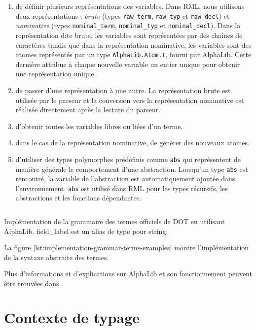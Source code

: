 \begin{enumerate}
  \item de définir plusieurs représentations des variables. Dans RML, nous utilisons deux
  représentations : \textit{brute} (types \verb|raw_term|,
  \verb|raw_typ| et \verb|raw_decl|) et \textit{nominative}
  (types \verb|nominal_term|, \verb|nominal_typ| et \verb|nominal_decl|). Dans la
  représentation dite brute, les variables sont représentées par des chaînes de
  caractères tandis que dans la représentation nominative, les variables sont
  des atomes représentés par un type \verb|AlphaLib.Atom.t|, fourni par
  AlphaLib. Cette dernière attribue à chaque nouvelle variable un entier
  unique pour obtenir une représentation unique.
\item de passer d'une représentation à une autre. La représentation brute est
  utilisée par le parseur et la conversion vers la représentation nominative est
  réalisée directement après la lecture du parseur.
\item d'obtenir toutes les variables libres ou liées d'un terme.
\item dans le cas de la représentation nominative, de générer des nouveaux atomes.
\item d'utiliser des types polymorphes prédéfinis comme \verb|abs| qui représentent de manière générale
  le comportement d'une abstraction. Lorsqu'un type \verb|abs|
  est rencontré, la variable de l'abstraction est automatiquement ajoutée dans
  l'environnement. \verb|abs| est utilisé dans RML pour les types récursifs,
  les abstractions et les fonctions dépendantes.
\end{enumerate}

\begin{listing}
  \inputminted{OCaml}{codes/grammar.ml}
  \caption{Implémentation de la grammaire des termes officiels de DOT en
    utilisant AlphaLib. field\_label est un alias de type pour string.}
  \label{lst:implementation-grammar-terms-examples}
\end{listing}

La figure \ref{lst:implementation-grammar-terms-examples} montre l'implémentation
de la syntaxe abstraite des termes.

Plus d'informations et d'explications sur AlphaLib et son fonctionnement peuvent
être trouvées dans \cite{alphalib-paper}.

\section{Contexte de typage}

